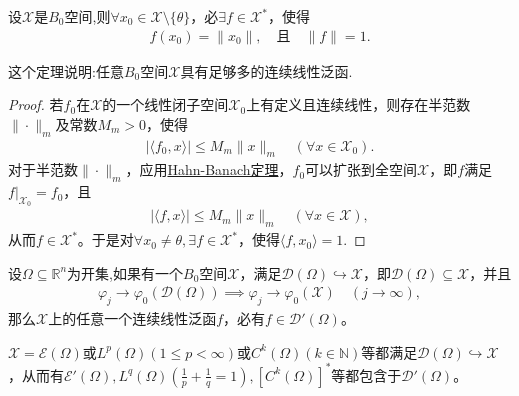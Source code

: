 \documentclass[../../main.tex]{subfiles}%
\begin{document}
\begin{theorem}\label{theorem:任意B0空集中必存在足够多的连续线性泛函}
设$\mathscr{X}$是$B_0$空间,则$\forall x_0 \in \mathscr{X} \setminus \{\theta\}$，必$\exists f \in \mathscr{X}^*$，使得
\begin{align*}
f(x_0) = \|x_0\|, \quad \text{且} \quad \|f\| = 1.
\end{align*}
\end{theorem}
\begin{remark}
这个定理说明:任意$B_0$空间$\mathscr{X}$具有足够多的连续线性泛函.
\end{remark}
\begin{proof}
若$f_0$在$\mathscr{X}$的一个线性闭子空间$\mathscr{X}_0$上有定义且连续线性，则存在半范数$\|\cdot\|_m$及常数$M_m>0$，使得
\begin{align*}
|\langle f_0,x\rangle|\leqslant M_m\|x\|_m\quad(\forall x\in\mathscr{X}_0).
\end{align*}
对于半范数$\|\cdot\|_m$，应用\hyperref[theorem:泛函分析--(哈恩-巴拿赫)Hahn-Banach定理]{Hahn-Banach定理}，$f_0$可以扩张到全空间$\mathscr{X}$，即$f$满足$f|_{\mathscr{X}_0}=f_0$，且
\begin{align*}
|\langle f,x\rangle|\leqslant M_m\|x\|_m\quad(\forall x\in\mathscr{X}),
\end{align*}
从而$f\in\mathscr{X}^*$。于是对$\forall x_0\neq\theta,\exists f\in\mathscr{X}^*$，使得$\langle f,x_0\rangle=1$.
\end{proof}

\begin{proposition}
设$\Omega\subseteq\mathbb{R}^n$为开集,如果有一个$B_0$空间$\mathscr{X}$，满足$\mathscr{D}(\Omega)\hookrightarrow\mathscr{X}$，即$\mathscr{D}(\Omega)\subseteq\mathscr{X}$，并且
\begin{align*}
\varphi_j\to\varphi_0(\mathscr{D}(\Omega))\implies\varphi_j\to\varphi_0(\mathscr{X})\quad(j\to\infty),
\end{align*}
那么$\mathscr{X}$上的任意一个连续线性泛函$f$，必有$f\in\mathscr{D}'(\Omega)$。
\end{proposition}

\begin{example}
$\mathscr{X}=\mathscr{E}(\Omega)$或$L^p(\Omega)(1\leqslant p<\infty)$或$C^k(\Omega)(k\in\mathbb{N})$等都满足$\mathscr{D}(\Omega)\hookrightarrow\mathscr{X}$，从而有$\mathscr{E}'(\Omega),L^q(\Omega)(\frac{1}{p}+\frac{1}{q}=1),[C^k(\Omega)]^*$等都包含于$\mathscr{D}'(\Omega)$。
\end{example}
\end{document}
